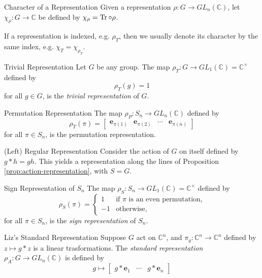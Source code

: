 
\begin{defn}{Character of a Representation}{}
	Given a representation \(\rho\colon G \to GL_n(\mathbb{C})\), let \(\chi_\rho\colon G \to \mathbb{C}\) be defined by \(\chi_\rho = \operatorname{Tr} \circ \rho\).
\end{defn}

If a representation is indexed, e.g. \(\rho_T\), then we usually denote its character by the same index, e.g. \(\chi_T = \chi_{\rho_T}\).

\begin{exmp}{Trivial Representation}{}
	Let \(G\) be any group. The map \(\rho_T \colon G \to GL_1(\mathbb{C}) = \mathbb{C}^\times\) defined by \[
		\rho_T(g) = 1
	\] for all \(g \in G\), is the \emph{trivial representation} of \(G\).
\end{exmp}

\begin{exmp}{Permutation Representation}{}
	The map \(\rho_P \colon S_n \to GL_n(\mathbb{C})\) defined by \[
		\rho_T(\pi) = 
		\begin{bmatrix}
			\mathbf{e}_{\pi(1)} &
			\mathbf{e}_{\pi(2)} &
			\cdots &
			\mathbf{e}_{\pi(n)} 
		\end{bmatrix}
	\] for all \(\pi \in S_n\), is the permutation representation.
\end{exmp}

\begin{exmp}{(Left) Regular Representation}{}
	Consider the action of \(G\) on itself defined by \(g * h = gh\). This yields a representation along the lines of Proposition \ref{prop:action-representation}, with \(S = G\).
\end{exmp}

\begin{exmp}{Sign Representation of \(S_n\)}{}
	The map \(\rho_S \colon S_n \to GL_1(\mathbb{C}) = \mathbb{C}^\times\) defined by \[
		\rho_S(\pi) = 
		\begin{cases}
			1 & \text{if \(\pi\) is an even permutation,} \\
			-1 & \text{otherwise,}
		\end{cases}
	\] for all \(\pi \in S_n\), is the \emph{sign representation} of \(S_n\).
\end{exmp}

\begin{exmp}{Liz's Standard Representation}{}
  Suppose \(G\) act on \(\mathbb{C}^n\), and \(\pi_g \colon \mathbb{C}^n \to \mathbb{C}^n\) defined by \(z \mapsto g * z\) is a linear trasformations. The \emph{standard representation} \(\rho_A \colon G \to GL_n(\mathbb{C})\) is defined by \[
    g \mapsto 
	\begin{bmatrix}
	  g * \mathbf{e}_1 &
	  \cdots &
	  g * \mathbf{e}_n
	\end{bmatrix}
  \] 
\end{exmp}
